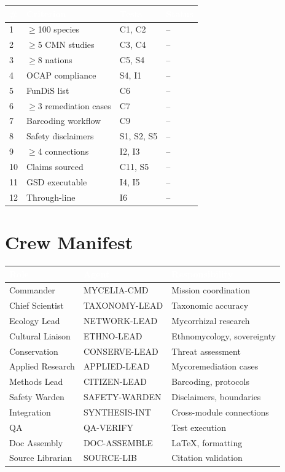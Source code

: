 \documentclass[11pt,letterpaper]{article}
\newcommand{\tableheader}[1]{\textbf{\sffamily\textcolor{white}{#1}}}
\begin{document}
\begin{center}
\begin{tabularx}{\textwidth}{C{0.8cm}XL{2cm}C{1.2cm}}
\toprule
{}
\tableheader{\#} & \tableheader{Criterion} & \tableheader{Tests} & \tableheader{Status} \\
 & $\geq$100 species & C1, C2 & -- \\
2 & $\geq$5 CMN studies & C3, C4 & -- \\
3 & $\geq$8 nations & C5, S4 & -- \\
4 & OCAP compliance & S4, I1 & -- \\
5 & FunDiS list & C6 & -- \\
6 & $\geq$3 remediation cases & C7 & -- \\
7 & Barcoding workflow & C9 & -- \\
8 & Safety disclaimers & S1, S2, S5 & -- \\
9 & $\geq$4 connections & I2, I3 & -- \\
10 & Claims sourced & C11, S5 & -- \\
11 & GSD executable & I4, I5 & -- \\
12 & Through-line & I6 & -- \\
\bottomrule
\end{tabularx}
\end{center}

\section{Crew Manifest}

\begin{center}
\begin{tabularx}{\textwidth}{L{2.5cm}L{2.5cm}X}
\toprule
{}
\tableheader{Role} & \tableheader{Agent} & \tableheader{Responsibility} \\
\midrule
Commander & MYCELIA-CMD & Mission coordination \\
Chief Scientist & TAXONOMY-LEAD & Taxonomic accuracy \\
Ecology Lead & NETWORK-LEAD & Mycorrhizal research \\
Cultural Liaison & ETHNO-LEAD & Ethnomycology, sovereignty \\
Conservation & CONSERVE-LEAD & Threat assessment \\
Applied Research & APPLIED-LEAD & Mycoremediation cases \\
Methods Lead & CITIZEN-LEAD & Barcoding, protocols \\
Safety Warden & SAFETY-WARDEN & Disclaimers, boundaries \\
Integration & SYNTHESIS-INT & Cross-module connections \\
QA & QA-VERIFY & Test execution \\
Doc Assembly & DOC-ASSEMBLE & LaTeX, formatting \\
Source Librarian & SOURCE-LIB & Citation validation \\
\bottomrule
\end{tabularx}
\end{center}
\end{document}
